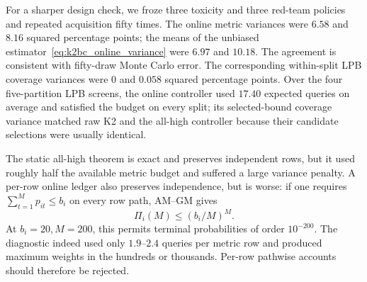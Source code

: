 For a sharper design check, we froze three toxicity and three red-team
policies and repeated acquisition fifty times.  The online metric variances
were $6.58$ and $8.16$ squared percentage points; the means of the unbiased
estimator~\eqref{eq:k2bc_online_variance} were $6.97$ and $10.18$.  The
agreement is consistent with fifty-draw Monte Carlo error.  The corresponding
within-split LPB coverage variances were $0$ and $0.058$ squared percentage
points.  Over the four five-partition LPB screens, the online controller used
$17.40$ expected queries on average and satisfied the budget on every split;
its selected-bound coverage variance matched raw K2 and the all-high
controller because their candidate selections were usually identical.

The static all-high theorem is exact and preserves independent rows, but it
used roughly half the available metric budget and suffered a large variance
penalty.  A per-row online ledger also preserves independence, but is worse:
if one requires $\sum_{t=1}^{M}p_{it}\leq b_i$ on every row path, AM--GM gives
\begin{equation}
 \Pi_i(M)\leq (b_i/M)^M.
\end{equation}
At $b_i=20,M=200$, this permits terminal probabilities of order $10^{-200}$.
The diagnostic indeed used only $1.9$--$2.4$ queries per metric row and
produced maximum weights in the hundreds or thousands.  Per-row pathwise
accounts should therefore be rejected.

